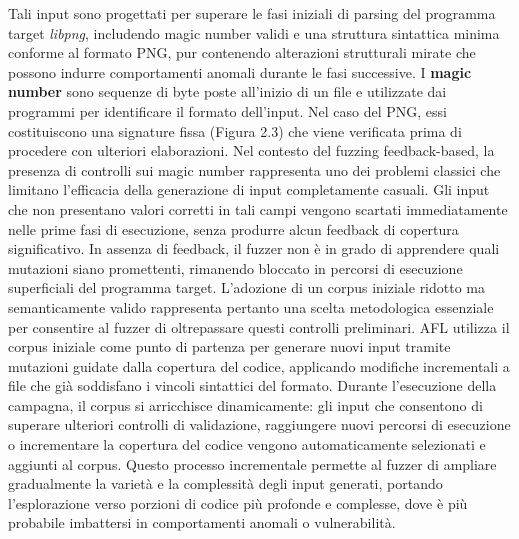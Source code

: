 \noindent
Tali input sono progettati per superare le fasi iniziali di parsing del programma target \textit{libpng}, includendo magic number validi e una struttura sintattica minima conforme al formato PNG, pur contenendo alterazioni strutturali mirate che possono indurre comportamenti anomali durante le fasi successive.
I \textbf{magic number} sono sequenze di byte poste all'inizio di un file e utilizzate dai programmi per identificare il formato dell'input. Nel caso del PNG, essi costituiscono una signature fissa (Figura 2.3) che viene verificata prima di procedere con ulteriori elaborazioni.
Nel contesto del fuzzing feedback-based, la presenza di controlli sui magic number rappresenta uno dei problemi classici che limitano l'efficacia della generazione di input completamente casuali.
Gli input che non presentano valori corretti in tali campi vengono scartati immediatamente nelle prime fasi di esecuzione, senza produrre alcun feedback di copertura significativo.
In assenza di feedback, il fuzzer non è in grado di apprendere quali mutazioni siano promettenti, rimanendo bloccato in percorsi di esecuzione superficiali del programma target.
L'adozione di un corpus iniziale ridotto ma semanticamente valido rappresenta pertanto una scelta metodologica essenziale per consentire al fuzzer di oltrepassare questi controlli preliminari. 
AFL utilizza il corpus iniziale come punto di partenza per generare nuovi input tramite mutazioni guidate dalla copertura del codice, applicando modifiche incrementali a file che già soddisfano i vincoli sintattici del formato.
Durante l'esecuzione della campagna, il corpus si arricchisce dinamicamente: gli input che consentono di superare ulteriori controlli di validazione, raggiungere nuovi percorsi di esecuzione o incrementare la copertura del codice vengono automaticamente selezionati e aggiunti al corpus.
Questo processo incrementale permette al fuzzer di ampliare gradualmente la varietà e la complessità degli input generati, portando l'esplorazione verso porzioni di codice più profonde e complesse, dove è più probabile imbattersi in comportamenti anomali o vulnerabilità.





  